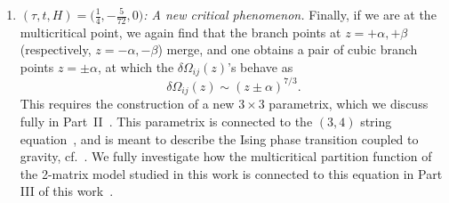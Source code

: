 \documentclass[pdftex]{sigma}
\numberwithin{equation}{section}
\begin{document}
\begin{Remark}
\begin{enumerate}
 \item[$(6)$] \textit{$(\tau,t,H) = \bigl(\frac{1}{4},-\frac{5}{72},0\bigr)$: A new critical phenomenon.}
 Finally, if we are at the multicritical point, we again find that the branch points at $z=+\alpha,+\beta$
 (respectively, $z=-\alpha,-\beta$) merge, and one obtains a pair of cubic branch points $z=\pm \alpha$, at which the $\delta\Omega_{ij}(z)$'s
 behave as
 \begin{equation*}
 \delta \Omega_{ij}(z) \sim (z\pm \alpha)^{7/3}.
 \end{equation*}
 This requires the construction of a new $3\times 3$ parametrix, which we discuss fully in Part~II~\cite{DHL2}. This parametrix is connected to the $(3,4)$ string equation~\cite{Douglas1}, and is meant to describe the Ising phase transition coupled to gravity, cf.~\cite{KB,DS,GM1,GM2}. We fully investigate how the multicritical partition function of the 2-matrix model studied in this work is connected
 to this equation in Part III of this work~\cite{DHL3}.
 \end{enumerate}
\end{Remark}
\end{document}
